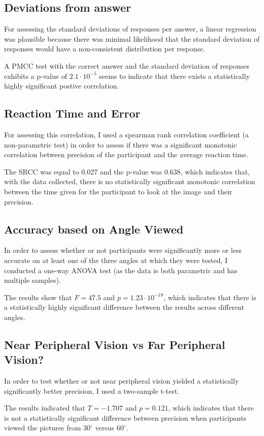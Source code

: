 \documentclass[12pt]{article}
\begin{document}
\subsection{Deviations from answer}

For assessing the standard deviations of responses per answer, a linear
regression was plausible because there was minimal likelihood that the standard
deviation of responses would have a non-consistent distribution per response.

A PMCC test with the correct answer and the standard deviation of responses
exhibits a p-value of $2.1 \cdot 10^{-5}$ seems to indicate that there exists a
statistically highly significant postive correlation.

\subsection{Reaction Time and Error}

For assessing this correlation, I used a spearman rank correlation coefficient
(a non-parametric test) in order to assess if there was a significant monotonic
correlation between precision of the participant and the average reaction time.

The SRCC was equal to 0.027 and the p-value was 0.638, which indicates that,
with the data collected, there is no statistically significant
monotonic correlation between the time given for the participant to look at the
image and their precision.

\subsection{Accuracy based on Angle Viewed}

In order to assess whether or not participants were significantly more or less
accurate on at least one of the three angles at which they were tested, I
conducted a one-way ANOVA test (as the data is both parametric and has multiple samples).

The results show that $F=47.5$ and $p = 1.23 \cdot 10^{-18}$, which indicates
that there is a statistically highly significant difference between the results across
different angles.

\subsection{Near Peripheral Vision vs Far Peripheral Vision?}

In order to test whether or not near peripheral vision yielded a statistically
significantly better precision, I used a two-sample t-test.

The results indicated that $T = -1.707$ and $p = 0.121$, which indicates that there is not a statistically significant difference between precision when participants viewed the pictures from $30^{\circ}$ versus $60^{\circ}$.
\end{document}
